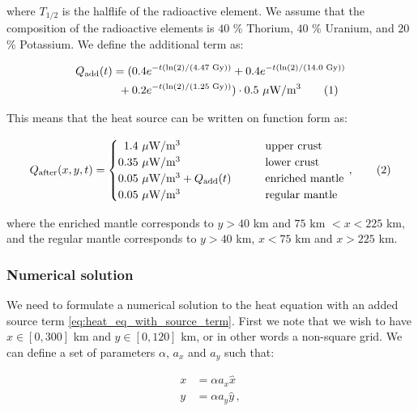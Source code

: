 \documentclass[reprint,english,notitlepage]{revtex4-1}  %
\newcommand\numberthis{\addtocounter{equation}{1}\tag{\theequation}}
\begin{document}
where $T_{1/2}$ is the halflife of the radioactive element. We assume that the composition of the radioactive elements is $40$ \% Thorium, $40$ \% Uranium, and $20$ \% Potassium. We define the additional term as:

\begin{align*}
Q_\text{add}(t) &= (0.4e^{-t(\ln(2)/(4.47  \text{ Gy}))   } + 0.4e^{-t(\ln(2)/(14.0  \text{ Gy}))   } \\
&\,\,\,+ 0.2e^{-t(\ln(2)/(1.25  \text{ Gy}))   }) \cdot 0.5 \text{ $\mu$W/m$^3$} \numberthis \label{eq:additional_heat}
\end{align*}

This means that the heat source can be written on function form as:

\begin{align*}
Q_\text{after}(x,y,t) = \begin{cases}
\,\,\, 1.4 \text{ $\mu$W/m$^3$} \quad \quad  &\text{upper crust} \\
0.35 \text{ $\mu$W/m$^3$} \quad \quad &\text{lower crust} \\
0.05 \text{ $\mu$W/m$^3$} + Q_\text{add}(t) \quad \quad &\text{enriched mantle} \\
0.05 \text{ $\mu$W/m$^3$} \quad \quad & \text{regular mantle}
\end{cases} \, , \numberthis \label{eq:refertilized_heat}
\end{align*}

where the enriched mantle corresponds to $y>40$ km and $75 \text{ km } < x < 225$ km, and the regular mantle corresponds to $y> 40$ km, $x<75$ km and $x>225$ km.
 



\subsubsection{Numerical solution} \label{sec:formalism_heat_eq_with_source_numerical_sol}

We need to formulate a numerical solution to the heat equation with an added source term \eqref{eq:heat_eq_with_source_term}. First we note that we wish to have $x \in [0,300]$ km and $y \in [0,120]$ km, or in other words a non-square grid. We can define a set of parameters $\alpha$, $a_x$ and $a_y$ such that:

\begin{align*}
x &= \alpha a_x \hat{x} \\
y &= \alpha a_y \hat{y} \, ,
\end{align*}
\end{document}
